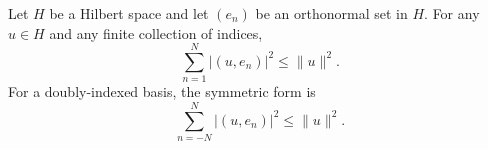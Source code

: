 Let $H$ be a Hilbert space and let $(e_n)$ be an orthonormal set in $H$. For any $u \in H$ and any finite collection of indices,
$$\sum_{n=1}^{N} |(u, e_n)|^2 \leq \|u\|^2.$$
For a doubly-indexed basis, the symmetric form is
$$\sum_{n=-N}^{N} |(u, e_n)|^2 \leq \|u\|^2.$$
